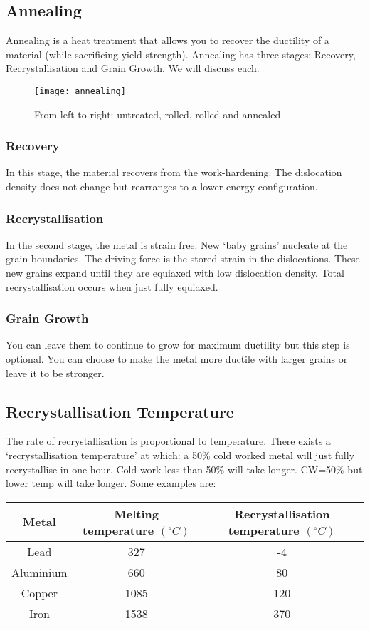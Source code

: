 \documentclass[12pt]{article}
\begin{document}
\subsection{Annealing}Annealing is a heat treatment that allows you to recover the ductility of a material (while sacrificing yield strength).
Annealing has three stages: Recovery, Recrystallisation and Grain Growth.
We will discuss each.

\begin{figure}[h]
  \texttt{[image: annealing]}
  \caption{From left to right: untreated, rolled, rolled and annealed}
\end{figure}

\subsubsection{Recovery}
In this stage, the material recovers from the work-hardening. 
The dislocation density does not change but rearranges to a lower energy configuration.

\subsubsection{Recrystallisation}
In the second stage, the metal is strain free.
New `baby grains' nucleate at the grain boundaries.
The driving force is the stored strain in the dislocations.
These new grains expand until they are equiaxed with low dislocation density.
Total recrystallisation occurs when just fully equiaxed.

\subsubsection{Grain Growth}
You can leave them to continue to grow for maximum ductility but this step is optional. 
You can choose to make the metal more ductile with larger grains or leave it to be stronger.

\subsection{Recrystallisation Temperature}
The rate of recrystallisation is proportional to temperature. 
There exists a `recrystallisation temperature' at which: a 50\% cold worked metal will just fully recrystallise in one hour.
Cold work less than 50\% will take longer. CW=50\% but lower temp will take longer.
Some examples are:

\begin{tabular}{c|c|c}
  Metal & Melting temperature $(^\circ C)$ & Recrystallisation temperature $(^\circ C)$ \\
  \hline
  Lead & 327 & -4 \\
  Aluminium & 660 & 80 \\
  Copper & 1085 & 120 \\
  Iron & 1538 & 370 \\
\end{tabular}
\end{document}
